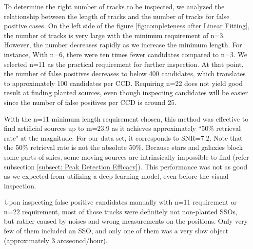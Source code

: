 To determine the right number of tracks to be inspected, we analyzed the relationship between the length of tracks and the number of tracks for false positive cases.
On the left side of the figure \ref{fig:completeness after Linear Fitting}, the number of tracks is very large with the minimum requirement of n=3.
However, the number decreases rapidly as we increase the minimum length.
For instance, With n=6, there were ten times fewer candidates compared to n=3.
We selected n=11 as the practical requirement for further inspection.
At that point, the number of false positives decreases to below 400 candidates, which translates to approximately 100 candidates per CCD.
Requiring n=22 does not yield good result at finding planted sources, even though inspecting candidates will be easier since the number of false positives per CCD is around 25.


With the n=11 minimum length requirement chosen, this method was effective to find artificial sources up to m=23.9 as it achieves approximately ``50\% retrieval rate" at the magnitude.
For our data set, it corresponds to SNR=7.2.
Note that the 50\% retrieval rate is not the absolute 50\%.
Because stars and galaxies block some parts of skies, some moving sources are intrinsically impossible to find (refer subsection \ref{subsect: Peak Detection Efficacy}).
This performance was not as good as we expected from utilizing a deep learning model, even before the visual inspection.

Upon inspecting false positive candidates manually with n=11 requirement or n=22 requirement, most of those tracks were definitely not non-planted SSOs, but rather caused by noises and wrong measurements on the positions.
Only very few of them included an SSO, and only one of them was a very slow object (approximately 3 arcseoncd/hour).


